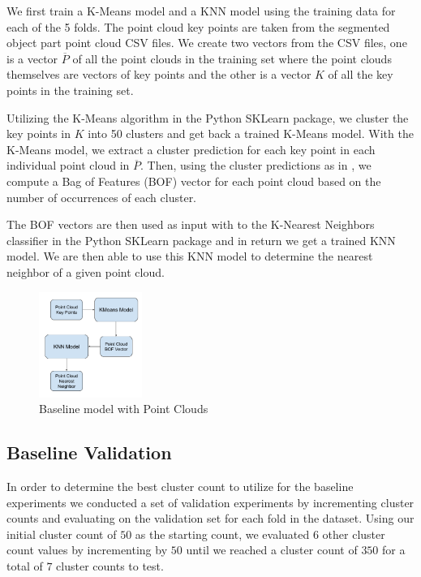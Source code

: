 \documentclass[letterpaper, 12 pt, conference]{ieeeconf}
\begin{document}
We first train a K-Means model and a KNN model using the training data for each of the 5 folds. The point cloud key points are taken from the segmented object part point cloud CSV files. We create two vectors from the CSV files, one is a vector $\overline{P}$ of all the point clouds in the training set where the point clouds themselves are vectors of key points and the other is a vector $K$ of all the key points in the training set. 

Utilizing the K-Means algorithm in the Python SKLearn package, we cluster the key points in $K$ into 50 clusters and get back a trained K-Means model. With the K-Means model, we extract a cluster prediction for each key point in each individual point cloud in $\overline{P}$. Then, using the cluster predictions as in \cite{csurka2004visual}, we compute a Bag of Features (BOF) vector for each point cloud based on the number of occurrences of each cluster.

The BOF vectors are then used as input with to the K-Nearest Neighbors classifier in the Python SKLearn package and in return we get a trained KNN model. We are then able to use this KNN model to determine the nearest neighbor of a given point cloud. 


\begin{figure}[htb!]
  \centering
  \includegraphics[width=0.3\textwidth]{Baseline-Point_Cloud}
  \caption{Baseline model with Point Clouds}
  \label{fig:Baseline_Point_Cloud}
\end{figure}

\subsection{Baseline Validation}

In order to determine the best cluster count to utilize for the baseline experiments we conducted a set of validation experiments by incrementing cluster counts and evaluating on the validation set for each fold in the dataset. Using our initial cluster count of $50$ as the starting count, we evaluated $6$ other cluster count values by incrementing by $50$ until we reached a cluster count of $350$ for a total of $7$ cluster counts to test. 
\end{document}
